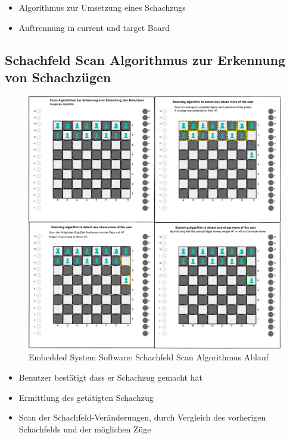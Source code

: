 \begin{itemize}
\tightlist
\item
  Algorithmus zur Umsetzung eines Schachzugs
\item
  Auftrennung in current und target Board
\end{itemize}

\hypertarget{schachfeld-scan-algorithmus-zur-erkennung-von-schachzuxfcgen}{%
\subsection{Schachfeld Scan Algorithmus zur Erkennung von
Schachzügen}\label{schachfeld-scan-algorithmus-zur-erkennung-von-schachzuxfcgen}}

\begin{figure}
\centering
\includegraphics{images/ATC_ChessMoveAlgorithm.png}
\caption{Embedded System Software: Schachfeld Scan Algorithmus Ablauf}
\end{figure}

\begin{itemize}
\tightlist
\item
  Benutzer bestätigt dass er Schachzug gemacht hat
\item
  Ermittlung des getätigten Schachzug
\item
  Scan der Schachfeld-Veränderungen, durch Vergleich des vorherigen
  Schachfelds und der möglichen Züge
\end{itemize}

